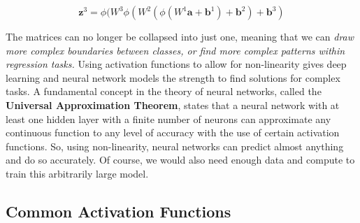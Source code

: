     $$\textbf{z}^3 = \phi(W^3\phi(W^2(\phi(W^1\textbf{a} + \textbf{b}^1) + \textbf{b}^2) + \textbf{b}^3)$$

    The matrices can no longer be collapsed into just one, meaning that we can \textit{draw more complex boundaries between classes, or find more complex patterns within regression tasks.} Using activation functions to allow for non-linearity gives deep learning and neural network models the strength to find solutions for complex tasks. A fundamental concept in the theory of neural networks, called the \textbf{Universal Approximation Theorem}, states that a neural network with at least one hidden layer with a finite number of neurons can approximate any continuous function to any level of accuracy with the use of certain activation functions. So, using non-linearity, neural networks can predict almost anything and do so accurately. Of course, we would also need enough data and compute to train this arbitrarily large model. 
\subsection{Common Activation Functions}

